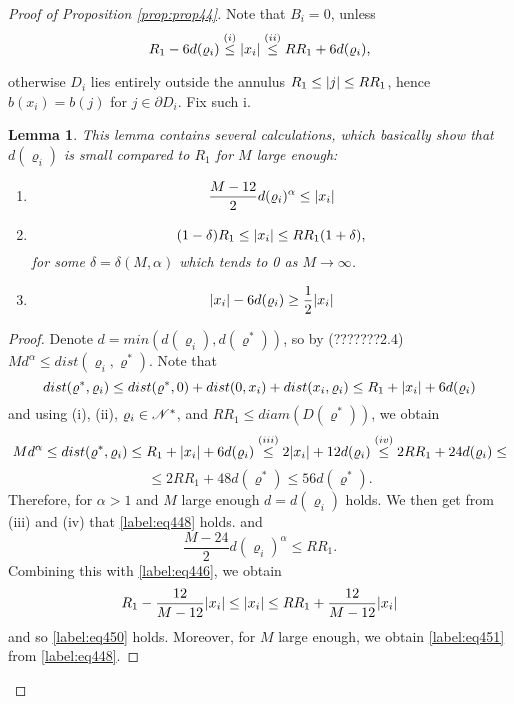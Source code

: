 \documentclass[11pt,reqno]{article}
\DeclarePairedDelimiter\abs{\lvert}{\rvert}%
\newtheorem{lemma}[thm]{Lemma}
\theoremstyle{definition}
\numberwithin{equation}{section}
\begin{document}
\begin{proof}[Proof of Proposition \eqref{prop:prop44}]
Note that $B_i=0$, unless 
\begin{equation} \label{label:eq446}
R_1-6d(\varrho_i) \overset{(i)}{\leq} \abs{x_i} \overset{(ii)}{\leq} RR_1 + 6d(\varrho_i),
\end{equation}

otherwise $D_i$ lies entirely outside the annulus $R_1 \leq \abs{j} \leq RR_1$, hence $b(x_i)=b(j)$ for $j \in \partial D_i$.
Fix such i. 

\begin{lemma}
This lemma contains several calculations, which basically show that $d(\varrho_i)$ is small compared to $R_1$ for $M$ large enough:
\begin{enumerate}
\item 
\begin{equation} \label{label:eq448}
\frac{M-12}{2}d(\varrho_i)^\alpha \leq \abs{x_i}
\end{equation}
\item 
\begin{equation} \label{label:eq450}
(1-\delta) R_1 \leq \abs{x_i} \leq RR_1(1+\delta),
\end{equation}
for some $\delta = \delta(M,\alpha)$ which tends to 0 as $M \rightarrow \infty$.
\item
\begin{equation} \label{label:eq451}
\abs{x_i} - 6d(\varrho_i) \geq \frac{1}{2} \abs{x_i}
\end{equation}
\end{enumerate}
\end{lemma}
\begin{proof}

Denote $d = min(d(\varrho_i), d(\varrho^*))$, so by (???????2.4) $ Md^\alpha \leq dist(\varrho_i, \varrho^*) $. Note that
$$
dist(\varrho^*, \varrho_i) \leq dist(\varrho^*, 0) + dist(0, x_i) + dist(x_i, \varrho_i) \leq R_1 + \abs{x_i} + 6d(\varrho_i)
$$
and using (i), (ii), $\varrho_i \in \mathscr{N}^*$, and $RR_1 \leq diam(D(\varrho^*))$, we obtain
$$
Md^\alpha \leq dist(\varrho^*, \varrho_i) \leq R_1 + \abs{x_i} + 6d(\varrho_i) \overset{(iii)}{\leq} 2\abs{x_i} + 12d(\varrho_i) \overset{(iv)}{\leq} 2RR_1 + 24 d(\varrho_i) \leq 
$$
$$
\leq 2RR_1 + 48 d(\varrho^*)  \leq 56d(\varrho^*).
$$
Therefore, for $\alpha > 1$ and $M$ large enough $d=d(\varrho_i)$ holds. We then get from (iii) and (iv) that \eqref{label:eq448} holds.
and %
$$
\frac{M-24}{2}d(\varrho_i)^\alpha \leq RR_1.  
$$
Combining this with \eqref{label:eq446}, we obtain
$$
R_1 - \frac{12}{M-12} \abs{x_i} \leq \abs{x_i} \leq RR_1 + \frac{12}{M-12}\abs{x_i}
$$
and so \eqref{label:eq450} holds.
Moreover, for $M$ large enough, we obtain \eqref{label:eq451} from \eqref{label:eq448}.
\end{proof}



\end{proof}
\end{document}
